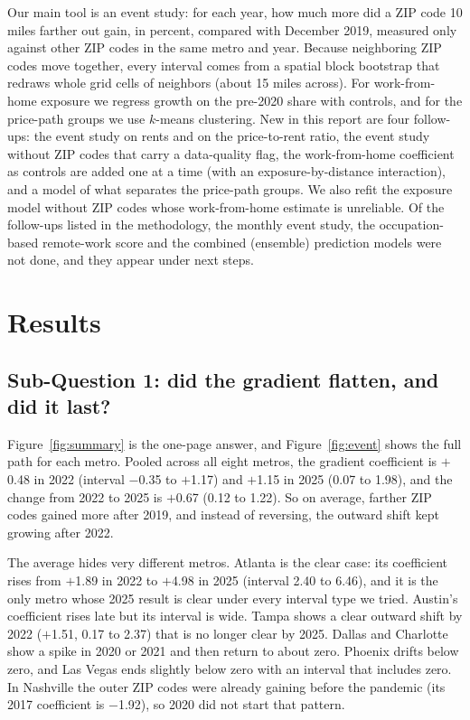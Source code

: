 \documentclass[11pt]{article}
\begin{document}
Our main tool is an event study: for each year, how much more did a ZIP code 10 miles farther out gain, in percent, compared with
December 2019, measured only against other ZIP codes in the same metro and year. Because neighboring ZIP codes move together, every
interval comes from a spatial block bootstrap that redraws whole grid cells of neighbors (about 15 miles across). For work-from-home
exposure we regress growth on the pre-2020 share with controls, and for the price-path groups we use $k$-means clustering. New in
this report are four follow-ups: the event study on rents and on the price-to-rent ratio, the event study without ZIP codes that carry
a data-quality flag, the work-from-home coefficient as controls are added one at a time (with an exposure-by-distance interaction), and
a model of what separates the price-path groups. We also refit the exposure model without ZIP codes whose
work-from-home estimate is unreliable. Of the follow-ups listed in the methodology, the monthly event study, the occupation-based
remote-work score and the combined (ensemble) prediction models were not done, and they appear under next steps.

\section{Results}

\subsection{Sub-Question 1: did the gradient flatten, and did it last?}

Figure~\ref{fig:summary} is the one-page answer, and Figure~\ref{fig:event} shows the full path for each metro. Pooled across all eight
metros, the gradient coefficient is $+$0.48 in 2022 (interval $-$0.35 to $+$1.17) and $+$1.15 in 2025 (0.07 to 1.98), and the change from 2022 to
2025 is $+$0.67 (0.12 to 1.22). So on average, farther ZIP codes gained more after 2019, and instead of reversing, the outward shift kept growing
after 2022.

The average hides very different metros. Atlanta is the clear case: its coefficient rises from $+$1.89 in 2022 to $+$4.98 in 2025
(interval 2.40 to 6.46), and it is the only metro whose 2025 result is clear under every interval type we tried. Austin's coefficient
rises late but its interval is wide. Tampa shows a clear outward shift by 2022 ($+$1.51, 0.17 to 2.37) that is no longer clear by 2025.
Dallas and Charlotte show a spike in 2020 or 2021 and then return to about zero. Phoenix drifts below zero, and Las Vegas ends slightly below zero with an interval that includes zero. In Nashville the
outer ZIP codes were already gaining before the pandemic (its 2017 coefficient is $-$1.92), so 2020 did not start that pattern.
\end{document}

